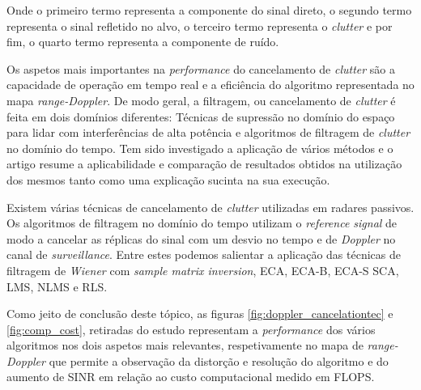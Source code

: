 Onde o primeiro termo representa a componente do sinal direto, o segundo termo representa o sinal refletido no alvo, o terceiro termo representa o \textit{clutter} e por fim, o quarto termo representa a componente de ruído.\par

Os aspetos mais importantes na \textit{performance} do cancelamento de \textit{clutter} são a capacidade de operação em tempo real e a eficiência do algoritmo representada no mapa \textit{range-Doppler}. De modo geral, a filtragem, ou cancelamento de \textit{clutter} é feita em dois domínios diferentes: Técnicas de supressão no domínio do espaço para lidar com interferências de alta potência e algoritmos de filtragem de \textit{clutter} no domínio do tempo. Tem sido investigado a aplicação de vários métodos e o artigo \cite{Peto2018} resume a aplicabilidade e comparação de resultados obtidos na utilização dos mesmos tanto como uma explicação sucinta na sua execução.\par 

Existem várias técnicas de cancelamento de \textit{clutter} utilizadas em radares passivos. Os algoritmos de filtragem no domínio do tempo utilizam o \textit{reference signal} de modo a cancelar as réplicas do sinal com um desvio no tempo e de \textit{Doppler} no canal de \textit{surveillance}. Entre estes podemos salientar a aplicação das técnicas de filtragem de \textit{Wiener} com \textit{sample matrix inversion}, \gls{ECA}, \gls{ECA-B}, \gls{ECA-S} \gls{SCA}, \gls{LMS}, \gls{NLMS} e \gls{RLS}.\par

Como jeito de conclusão deste tópico, as figuras \ref{fig:doppler_cancelationtec} e \ref{fig:comp_cost}, retiradas do estudo \cite{Petri2012}  representam a \textit{performance} dos 
vários algoritmos nos dois aspetos mais relevantes, respetivamente no mapa de \textit{range-Doppler} que permite a observação da distorção e resolução do algoritmo e do aumento de \gls{SINR} em relação ao custo computacional  medido em \gls{FLOPS}.


